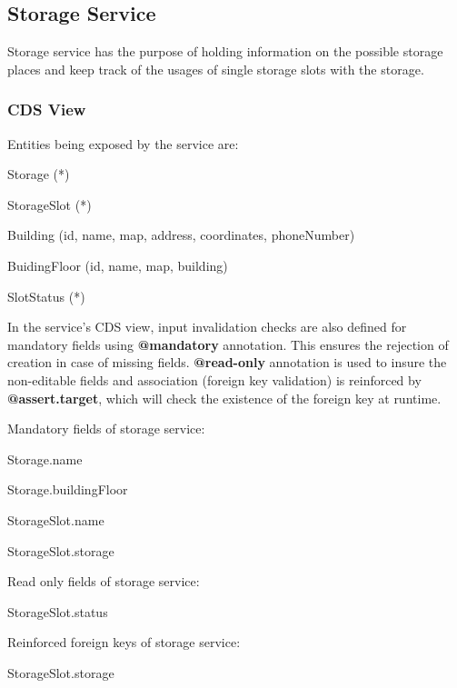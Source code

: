 \subsection{Storage Service}
Storage service has the purpose of holding information on the possible storage places and keep track of the usages of single storage slots with the storage. 

\subsubsection{CDS View}

Entities being exposed by the service are:
\begin{compactenum}
	\item Storage (*)
    \item StorageSlot (*)
    \item Building (id, name, map, address, coordinates, phoneNumber)
    \item BuidingFloor (id, name, map, building)
    \item SlotStatus (*)
\end{compactenum}

\bigskip
In the service's CDS view, input invalidation checks are also defined for mandatory fields using \textbf{@mandatory} annotation. This ensures the rejection of creation in case of missing fields. \textbf{@read-only} annotation is used to insure the non-editable fields and association (foreign key validation) is reinforced by \textbf{@assert.target}, which will check the existence of the foreign key at runtime.

\bigskip
Mandatory fields of storage service:
\begin{compactenum}
	\item Storage.name
    \item Storage.buildingFloor
    \item StorageSlot.name
    \item StorageSlot.storage
\end{compactenum}

\bigskip
Read only fields of storage service:
\begin{compactenum}
	\item StorageSlot.status
\end{compactenum}

\bigskip
Reinforced foreign keys of storage service:
\begin{compactenum}
	\item StorageSlot.storage
\end{compactenum}

